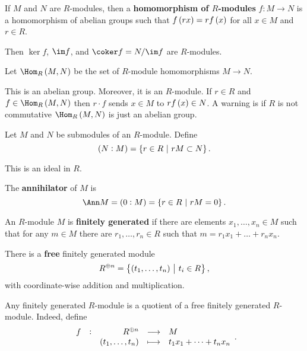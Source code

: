 \begin{definition}
If $ M $ and $ N $ are $ R $-modules, then a \textbf{homomorphism of $ R $-modules} $ f : M \to N $ is a homomorphism of abelian groups such that $ f\br{rx} = rf\br{x} $ for all $ x \in M $ and $ r \in R $.
\end{definition}

Then $ \ker f $, $ \im f $, and $ \coker f = N / \im f $ are $ R $-modules.

\begin{definition}
Let $ \Hom_R\br{M, N} $ be the set of $ R $-module homomorphisms $ M \to N $.
\end{definition}

This is an abelian group. Moreover, it is an $ R $-module. If $ r \in R $ and $ f \in \Hom_R\br{M, N} $ then $ r \cdot f $ sends $ x \in M $ to $ rf\br{x} \in N $. A warning is if $ R $ is not commutative $ \Hom_R\br{M, N} $ is just an abelian group.

\begin{definition}
Let $ M $ and $ N $ be submodules of an $ R $-module. Define
$$ \br{N : M} = \cbr{r \in R \st rM \subset N}. $$
\end{definition}

This is an ideal in $ R $.

\begin{example*}
The \textbf{annihilator} of $ M $ is
$$ \Ann M = \br{0 : M} = \cbr{r \in R \st rM = 0}. $$
\end{example*}

\pagebreak

\begin{definition}
An $ R $-module $ M $ is \textbf{finitely generated} if there are elements $ x_1, \dots, x_n \in M $ such that for any $ m \in M $ there are $ r_1, \dots, r_n \in R $ such that $ m = r_1x_1 + \dots + r_nx_n $.
\end{definition}

\begin{example*}
There is a \textbf{free} finitely generated module
$$ R^{\oplus n} = \cbr{\br{t_1, \dots, t_n} \st t_i \in R}, $$
with coordinate-wise addition and multiplication.
\end{example*}

\begin{remark*}
Any finitely generated $ R $-module is a quotient of a free finitely generated $ R $-module. Indeed, define
$$ \function[f]{R^{\oplus n}}{M}{\br{t_1, \dots, t_n}}{t_1x_1 + \dots + t_nx_n}. $$
\end{remark*}

